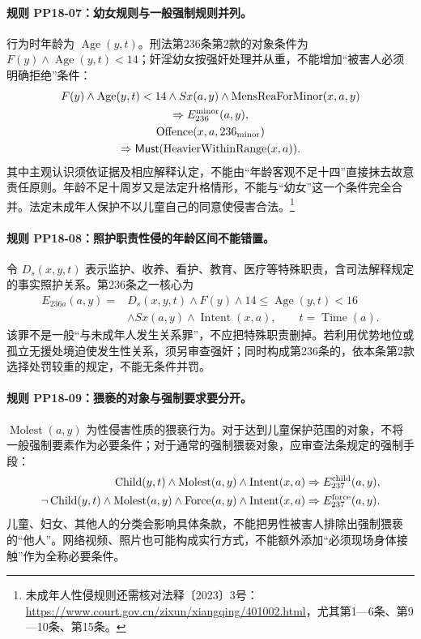 \paragraph{规则 PP18-07：幼女规则与一般强制规则并列。}
\mbox{}\par
行为时年龄为 $\operatorname{Age}(y,t)$。刑法第236条第2款的对象条件为 $F(y)\land\operatorname{Age}(y,t)<14$；奸淫幼女按强奸处理并从重，不能增加“被害人必须明确拒绝”条件：
\[
\begin{gathered}
F(y)\land\operatorname{Age}(y,t)<14\land Sx(a,y)
\land\operatorname{MensReaForMinor}(x,a,y)\\
\Rightarrow E_{236}^{\rm minor}(a,y),\\
\operatorname{Offence}(x,a,236_{\rm minor})\\
\Rightarrow\mathsf{Must}(\operatorname{HeavierWithinRange}(x,a)).
\end{gathered}
\]
其中主观认识须依证据及相应解释认定，不能由“年龄客观不足十四”直接抹去故意责任原则。年龄不足十周岁又是法定升格情形，不能与“幼女”这一个条件完全合并。法定未成年人保护不以儿童自己的同意使侵害合法。\footnote{未成年人性侵规则还需核对法释〔2023〕3号：\url{https://www.court.gov.cn/zixun/xiangqing/401002.html}，尤其第1—6条、第9—10条、第15条。}

\paragraph{规则 PP18-08：照护职责性侵的年龄区间不能错置。}
\mbox{}\par
令 $D_s(x,y,t)$ 表示监护、收养、看护、教育、医疗等特殊职责，含司法解释规定的事实照护关系。第236条之一核心为
\[
\begin{aligned}
E_{236a}(a,y)={}&D_s(x,y,t)\land F(y)
\land14\le\operatorname{Age}(y,t)<16\\
&\land Sx(a,y)\land\operatorname{Intent}(x,a),
\qquad t=\operatorname{Time}(a).
\end{aligned}
\]
该罪不是一般“与未成年人发生关系罪”，不应把特殊职责删掉。若利用优势地位或孤立无援处境迫使发生性关系，须另审查强奸；同时构成第236条的，依本条第2款选择处罚较重的规定，不能无条件并罚。

\paragraph{规则 PP18-09：猥亵的对象与强制要求要分开。}
\mbox{}\par
$\operatorname{Molest}(a,y)$ 为性侵害性质的猥亵行为。对于达到儿童保护范围的对象，不将一般强制要素作为必要条件；对于通常的强制猥亵对象，应审查法条规定的强制手段：
\[
\begin{aligned}
\operatorname{Child}(y,t)\land\operatorname{Molest}(a,y)
\land\operatorname{Intent}(x,a)&\Rightarrow E_{237}^{\rm child}(a,y),\\
\neg\operatorname{Child}(y,t)\land\operatorname{Molest}(a,y)
\land\operatorname{Force}(a,y)\land\operatorname{Intent}(x,a)
&\Rightarrow E_{237}^{\rm force}(a,y).
\end{aligned}
\]
儿童、妇女、其他人的分类会影响具体条款，不能把男性被害人排除出强制猥亵的“他人”。网络视频、照片也可能构成实行方式，不能额外添加“必须现场身体接触”作为全称必要条件。


